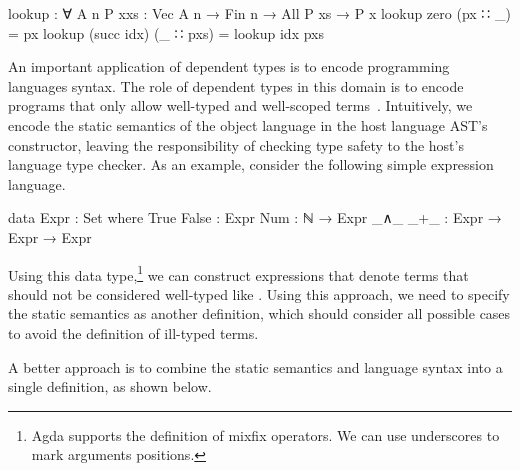 \documentclass[sigconf]{acmart}
\begin{document}
\begin{spec}
  lookup : ∀ {A n P x}{xs : Vec A n} → Fin n → All P xs → P x
  lookup zero (px ∷ _) = px
  lookup (succ idx) (_ ∷ pxs) = lookup idx pxs
\end{spec}
An important application of dependent types is to encode programming languages
syntax. The role of dependent types in this domain is to encode programs that
only allow well-typed and well-scoped terms~\cite{Benton2012}. Intuitively, we encode
the static semantics of the object language in the host language AST's
constructor, leaving the responsibility of checking type safety to the
host's language type checker. As an example, consider the following simple
expression language.
\begin{spec}
  data Expr : Set where
    True False : Expr
    Num : ℕ → Expr
    _∧_ _+_ : Expr → Expr → Expr
\end{spec}
Using this data type,\footnote{Agda supports the definition of mixfix operators.
We can use underscores to mark arguments positions.} we can construct expressions
that denote terms that should not be considered well-typed like
. Using this approach, we need to specify the static semantics
as another definition, which should consider all possible cases to avoid the
definition of ill-typed terms.

A better approach is to combine the static semantics and language syntax into
a single definition, as shown below.
\end{document}
